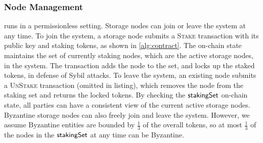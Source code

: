 \subsubsection{Node Management}
\label{sec:design:proto:mgmt}
\sys runs in a permissionless setting.
Storage nodes can join or leave the system at any time.
To join the system, a storage node submits a \textsc{Stake} transaction with its public key and staking tokens, as shown in \cref{alg:contract}.
The on-chain state maintains the set of currently staking nodes, which are the active storage nodes, in the system.
The transaction adds the node to the set, and locks up the staked tokens, in defense of Sybil attacks.
To leave the system, an existing node submits a \textsc{UnStake} transaction (omitted in listing), which removes the node from the staking set and returns the locked tokens.
 
By checking the $\textsf{stakingSet}$ on-chain state, all parties can have a consistent view of the current active storage nodes.
Byzantine storage nodes can also freely join and leave the system.
However, we assume Byzantine entities are bounded by $\frac{1}{3}$ of the overall tokens, so at most $\frac{1}{3}$ of the nodes in the $\textsf{stakingSet}$ at any time can be Byzantine.

